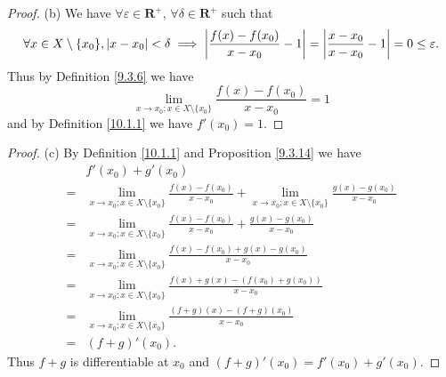 \begin{proof}{(b)}
    We have \(\forall \varepsilon \in \mathbf{R}^+\), \(\forall \delta \in \mathbf{R}^+\) such that
    \[
        \forall x \in X \setminus \{x_0\}, \abs*{x - x_0} < \delta \implies \abs*{\frac{f(x) - f(x_0)}{x - x_0} - 1} = \abs*{\frac{x - x_0}{x - x_0} - 1} = 0 \leq \varepsilon.
    \]
    Thus by Definition \ref{9.3.6} we have
    \[
        \lim_{x \to x_0 ; x \in X \setminus \{x_0\}} \frac{f(x) - f(x_0)}{x - x_0} = 1
    \]
    and by Definition \ref{10.1.1} we have \(f'(x_0) = 1\).
\end{proof}

\begin{proof}{(c)}
    By Definition \ref{10.1.1} and Proposition \ref{9.3.14} we have
    \begin{align*}
          & f'(x_0) + g'(x_0)                                                                                                                                       \\
        = & \lim_{x \to x_0 ; x \in X \setminus \{x_0\}} \frac{f(x) - f(x_0)}{x - x_0} + \lim_{x \to x_0 ; x \in X \setminus \{x_0\}} \frac{g(x) - g(x_0)}{x - x_0} \\
        = & \lim_{x \to x_0 ; x \in X \setminus \{x_0\}} \frac{f(x) - f(x_0)}{x - x_0} + \frac{g(x) - g(x_0)}{x - x_0}                                              \\
        = & \lim_{x \to x_0 ; x \in X \setminus \{x_0\}} \frac{f(x) - f(x_0) + g(x) - g(x_0)}{x - x_0}                                                              \\
        = & \lim_{x \to x_0 ; x \in X \setminus \{x_0\}} \frac{f(x) + g(x) - (f(x_0) + g(x_0))}{x - x_0}                                                            \\
        = & \lim_{x \to x_0 ; x \in X \setminus \{x_0\}} \frac{(f + g)(x) - (f + g)(x_0)}{x - x_0}                                                                  \\
        = & (f + g)'(x_0).
    \end{align*}
    Thus \(f + g\) is differentiable at \(x_0\) and \((f + g)'(x_0) = f'(x_0) + g'(x_0)\).
\end{proof}

